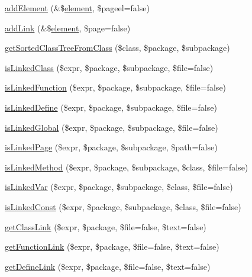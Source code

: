 \begin{DoxyCompactItemize}
\item 
\hyperlink{class_converter_a2bea56c6be6c56ca42b4a4f2ecc25bb1}{add\-Element} (\&\$\hyperlink{bug-904820_8php_aa94081298ab2dfd0f261cce6c203d9aa}{element}, \$pageel=false)
\item 
\hyperlink{class_converter_a74ff4a5ed7b54e189e6603245f4cf7d1}{add\-Link} (\&\$\hyperlink{bug-904820_8php_aa94081298ab2dfd0f261cce6c203d9aa}{element}, \$page=false)
\item 
\hyperlink{class_converter_a4608c8dbec49cd82b6a11951b2704ae5}{get\-Sorted\-Class\-Tree\-From\-Class} (\$class, \$package, \$subpackage)
\item 
\hyperlink{class_converter_a9ce4d4d84aedd3278f9da6c1964e54c8}{is\-Linked\-Class} (\$expr, \$package, \$subpackage, \$file=false)
\item 
\hyperlink{class_converter_a0f2ec547d519717e3b7b39733c7181ed}{is\-Linked\-Function} (\$expr, \$package, \$subpackage, \$file=false)
\item 
\hyperlink{class_converter_ae25587031b791adf1fd0485466f2127c}{is\-Linked\-Define} (\$expr, \$package, \$subpackage, \$file=false)
\item 
\hyperlink{class_converter_ac895b40b2302c1c232b2be04d691f2da}{is\-Linked\-Global} (\$expr, \$package, \$subpackage, \$file=false)
\item 
\hyperlink{class_converter_a4ca4a72b99a3701a32ddff90eb102b6a}{is\-Linked\-Page} (\$expr, \$package, \$subpackage, \$path=false)
\item 
\hyperlink{class_converter_a4c1b83be28bfce8f7368bcba397c30f6}{is\-Linked\-Method} (\$expr, \$package, \$subpackage, \$class, \$file=false)
\item 
\hyperlink{class_converter_a9c0e92e0dbdeb49733d39492ff6c8dce}{is\-Linked\-Var} (\$expr, \$package, \$subpackage, \$class, \$file=false)
\item 
\hyperlink{class_converter_a389003339f06c0ea6ec876d610e35481}{is\-Linked\-Const} (\$expr, \$package, \$subpackage, \$class, \$file=false)
\item 
\hyperlink{class_converter_a800228e73b38402c365fec0ab9961c1d}{get\-Class\-Link} (\$expr, \$package, \$file=false, \$text=false)
\item 
\hyperlink{class_converter_ab5f43d9a50aae936411c84a680e9c186}{get\-Function\-Link} (\$expr, \$package, \$file=false, \$text=false)
\item 
\hyperlink{class_converter_a17086c17d82323b3e929d24ad6da092d}{get\-Define\-Link} (\$expr, \$package, \$file=false, \$text=false)
\item 

\end{DoxyCompactItemize}
